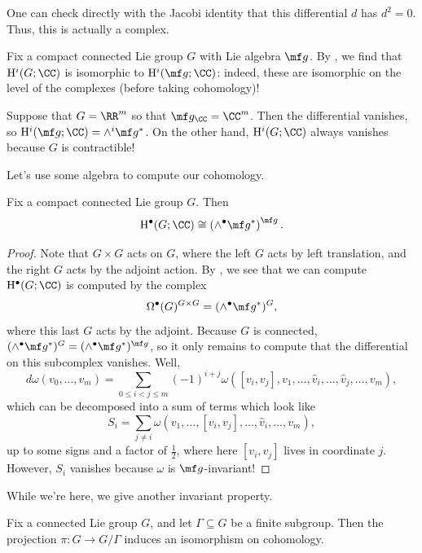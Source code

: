 \documentclass[../notes.tex]{subfiles}
\begin{document}
\begin{remark}
	One can check directly with the Jacobi identity that this differential $d$ has $d^2=0$. Thus, this is actually a complex.
\end{remark}
\begin{example} \label{ex:compact-cohomology}
	Fix a compact connected Lie group $G$ with Lie algebra $\mf g$. By , we find that $\mathrm H^i(G;\CC)$ is isomorphic to $\mathrm H^i(\mf g;\CC)$: indeed, these are isomorphic on the level of the complexes (before taking cohomology)!
\end{example}
\begin{example}
	Suppose that $G=\RR^m$ so that $\mf g_\CC=\CC^m$. Then the differential vanishes, so $\mathrm H^i(\mf g;\CC)=\land^i\mf g^*$. On the other hand, $\mathrm H^i(G;\CC)$ always vanishes because $G$ is contractible!
\end{example}
Let's use some algebra to compute our cohomology.
\begin{proposition}
	Fix a compact connected Lie group $G$. Then
	\[\mathrm H^\bullet(G;\CC)\cong\left(\land^\bullet\mf g^*\right)^{\mf g}.\]
\end{proposition}
\begin{proof}
	Note that $G\times G$ acts on $G$, where the left $G$ acts by left translation, and the right $G$ acts by the adjoint action. By , we see that we can compute $\mathrm H^\bullet(G;\CC)$ is computed by the complex
	\[\Omega^\bullet(G)^{G\times G}=(\land^\bullet\mf g^*)^G,\]
	where this last $G$ acts by the adjoint. Because $G$ is connected, $(\land^\bullet\mf g^*)^G=(\land^\bullet\mf g^*)^{\mf g}$, so it only remains to compute that the differential on this subcomplex vanishes. Well,
	\[d\omega(v_0,\ldots,v_m)=\sum_{0\le i<j\le m}(-1)^{i+j}\omega([v_i,v_j],v_1,\ldots,\widehat v_i,\ldots,\widehat v_j,\ldots,v_m),\]
	which can be decomposed into a sum of terms which look like
	\[S_i=\sum_{j\ne i}\omega(v_1,\ldots,[v_i,v_j],\ldots,\widehat v_i,\ldots,v_m),\]
	up to some signs and a factor of $\frac12$, where here $[v_i,v_j]$ lives in coordinate $j$. However, $S_i$ vanishes because $\omega$ is $\mf g$-invariant!
\end{proof}
While we're here, we give another invariant property.
\begin{proposition}
	Fix a connected Lie group $G$, and let $\Gamma\subseteq G$ be a finite subgroup. Then the projection $\pi\colon G\to G/\Gamma$ induces an isomorphism on cohomology.
\end{proposition}
\end{document}

